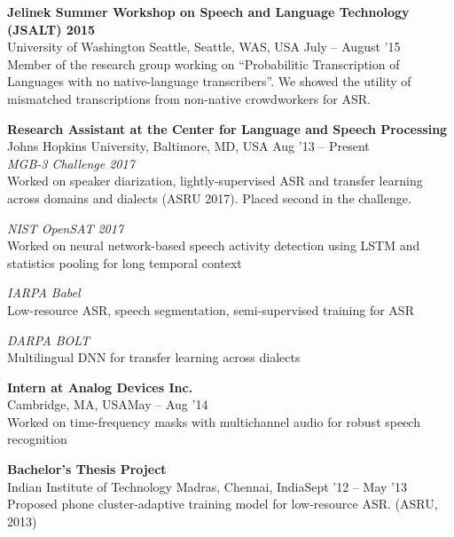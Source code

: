\documentclass[margin,line,pifont,palatino,courier]{res}
\begin{document}
\begin{resume}
\textbf{Jelinek Summer Workshop on Speech and Language Technology (JSALT) 2015 } \\
University of Washington Seattle, Seattle, WAS, USA \hfill
July -- August '15 \vspace{2pt} \\
Member of the research group working on ``Probabilitic Transcription of Languages with no native-language transcribers''. We showed the utility of mismatched transcriptions from non-native crowdworkers for ASR.
\vspace{-5pt}

\textbf{Research Assistant at the Center for Language and Speech Processing} \\
Johns Hopkins University, Baltimore, MD, USA \hfill Aug '13 -- Present \vspace{2pt} \\
\textit{MGB-3 Challenge 2017} \\
Worked on speaker diarization, lightly-supervised ASR and transfer learning across domains and dialects (ASRU 2017). Placed second in the challenge.

\textit{NIST OpenSAT 2017} \\
Worked on neural network-based speech activity detection using LSTM and statistics pooling for long temporal context

\textit{IARPA Babel} \\
Low-resource ASR, speech segmentation, semi-supervised training for ASR

\textit{DARPA BOLT}\\
Multilingual DNN for transfer learning across dialects

\textbf{Intern at Analog Devices Inc.} \\
Cambridge, MA, USA\hfill May -- Aug '14 \vspace{2pt} \\
Worked on time-frequency masks with multichannel audio for robust speech recognition
\vspace{-5pt}

\textbf{Bachelor's Thesis Project} \\
Indian Institute of Technology Madras, Chennai, India\hfill Sept '12 -- May '13 \vspace{2pt}  \\
Proposed phone cluster-adaptive training model for low-resource ASR. (ASRU, 2013)


\end{resume}
\end{document}
